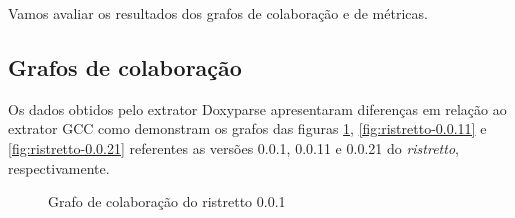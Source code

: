 Vamos avaliar os resultados dos grafos de colaboração e de métricas.

\subsection{Grafos de colaboração}

Os dados obtidos pelo extrator Doxyparse apresentaram diferenças em relação ao
extrator GCC como demonstram os grafos das figuras \ref{fig:ristretto-0.0.1},
\ref{fig:ristretto-0.0.11} e \ref{fig:ristretto-0.0.21} referentes as versões 0.0.1,
0.0.11 e 0.0.21 do {\it ristretto}, respectivamente.

\begin{figure}
\center
{}
\qquad
{}
\caption{Grafo de colaboração do ristretto 0.0.1}
\label{fig:ristretto-0.0.1}
\end{figure}

